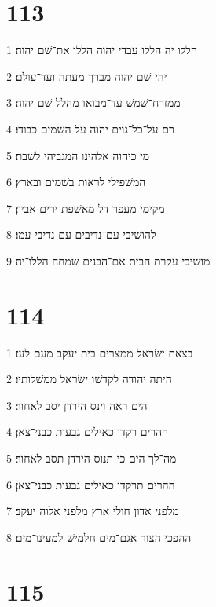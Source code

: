 \chapter{113}

\par 1 הללו יה הללו עבדי יהוה הללו את־שׁם יהוה׃
\par 2 יהי שׁם יהוה מברך מעתה ועד־עולם׃
\par 3 ממזרח־שׁמשׁ עד־מבואו מהלל שׁם יהוה׃
\par 4 רם על־כל־גוים יהוה על השׁמים כבודו׃
\par 5 מי כיהוה אלהינו המגביהי לשׁבת׃
\par 6 המשׁפילי לראות בשׁמים ובארץ׃
\par 7 מקימי מעפר דל מאשׁפת ירים אביון׃
\par 8 להושׁיבי עם־נדיבים עם נדיבי עמו׃
\par 9 מושׁיבי עקרת הבית אם־הבנים שׂמחה הללו־יה׃

\chapter{114}

\par 1 בצאת ישׂראל ממצרים בית יעקב מעם לעז׃
\par 2 היתה יהודה לקדשׁו ישׂראל ממשׁלותיו׃
\par 3 הים ראה וינס הירדן יסב לאחור׃
\par 4 ההרים רקדו כאילים גבעות כבני־צאן׃
\par 5 מה־לך הים כי תנוס הירדן תסב לאחור׃
\par 6 ההרים תרקדו כאילים גבעות כבני־צאן׃
\par 7 מלפני אדון חולי ארץ מלפני אלוה יעקב׃
\par 8 ההפכי הצור אגם־מים חלמישׁ למעינו־מים׃

\chapter{115}

